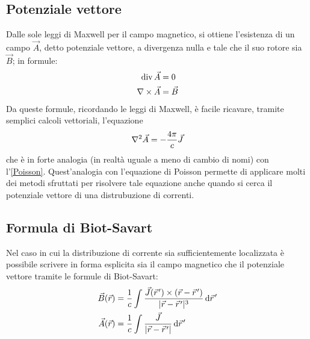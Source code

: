 \documentclass[../main.tex]{subfiles}
\begin{document}
\subsection{Potenziale vettore}
Dalle sole leggi di Maxwell per il campo magnetico, si ottiene l'esistenza di un campo $\vec A$, detto potenziale vettore, a divergenza nulla e tale che il suo rotore sia $\vec B$; in formule:
\begin{align}
	\operatorname{div} \vec A &=0 \label{DivPotVettore} \\
	\nabla\times \vec A &=\vec B \label{RotPotVettore}
\end{align}
Da queste formule, ricordando le leggi di Maxwell, è facile ricavare, tramite semplici calcoli vettoriali, l'equazione
\begin{equation*}  \label{PoissonMagnetico}
	\nabla^2 \vec A=-\frac{4\pi}c\vec J
\end{equation*}
che è in forte analogia (in realtà uguale a meno di cambio di nomi) con l'\cref{Poisson}.
Quest'analogia con l'equazione di Poisson permette di applicare molti dei metodi sfruttati per risolvere tale equazione anche quando si cerca il potenziale vettore di una distrubuzione di correnti.

\subsection{Formula di Biot-Savart}
Nel caso in cui la distribuzione di corrente sia sufficientemente localizzata è possibile scrivere in forma esplicita sia il campo magnetico che il potenziale vettore tramite le formule di Biot-Savart:
\begin{align*}
	\vec B(\vec r)&=\frac 1c\int \frac{\vec J(\pvec r')\times(\vec r-\pvec r')}{\abs{\vec r-\pvec r'}^3}\de \pvec r' \label{BiotSavartB} \\
	\vec A(\vec r)&=\frac 1c\int \frac{\vec J}{\abs{\vec r-\pvec r'}}\de \pvec r'
\end{align*}
\end{document}
